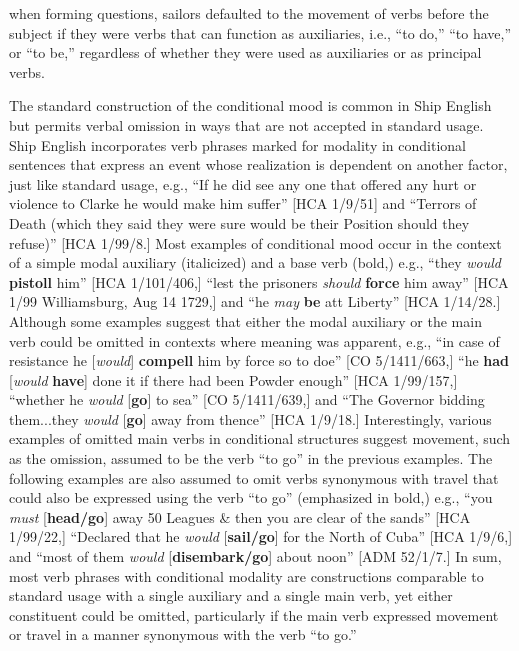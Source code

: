 when forming questions, sailors defaulted to the movement of verbs before the subject if they were verbs that can function as auxiliaries, i.e., “to do,” “to have,” or “to be,” regardless of whether they were used as auxiliaries or as principal verbs.

  The standard construction of the conditional mood is common in Ship English but permits verbal omission in ways that are not accepted in standard usage.  Ship English incorporates verb phrases marked for modality in conditional sentences that express an event whose realization is dependent on another factor, just like standard usage, e.g., “If he did see any one that offered any hurt or violence to Clarke he would make him suffer” [HCA 1/9/51] and “Terrors of Death (which they said they were sure would be their Position should they refuse)” [HCA 1/99/8.] Most examples of conditional mood occur in the context of a simple modal auxiliary (italicized) and a base verb (bold,) e.g., “they \textit{would} \textbf{pistoll} him” [HCA 1/101/406,] “lest the prisoners \textit{should} \textbf{force} him away” [HCA 1/99 Williamsburg, Aug 14 1729,] and “he \textit{may} \textbf{be} att Liberty” [HCA 1/14/28.] Although some examples suggest that either the modal auxiliary or the main verb could be omitted in contexts where meaning was apparent, e.g., “in case of resistance he [\textit{would}] \textbf{compell} him by force so to doe” [CO 5/1411/663,] “he \textbf{had} [\textit{would} \textbf{have}] done it if there had been Powder enough” [HCA 1/99/157,] “whether he \textit{would} [\textbf{go}] to sea” [CO 5/1411/639,] and “The Governor bidding them...they \textit{would} [\textbf{go}] away from thence” [HCA 1/9/18.] Interestingly, various examples of omitted main verbs in conditional structures suggest movement, such as the omission, assumed to be the verb “to go” in the previous examples. The following examples are also assumed to omit verbs synonymous with travel that could also be expressed using the verb “to go” (emphasized in bold,) e.g., “you \textit{must} [\textbf{head/go}] away 50 Leagues \& then you are clear of the sands” [HCA 1/99/22,] “Declared that he \textit{would} [\textbf{sail/go}] for the North of Cuba” [HCA 1/9/6,] and “most of them \textit{would} [\textbf{disembark/go}] about noon” [ADM 52/1/7.] In sum, most verb phrases with conditional modality are constructions comparable to standard usage with a single auxiliary and a single main verb, yet either constituent could be omitted, particularly if the main verb expressed movement or travel in a manner synonymous with the verb “to go.”

